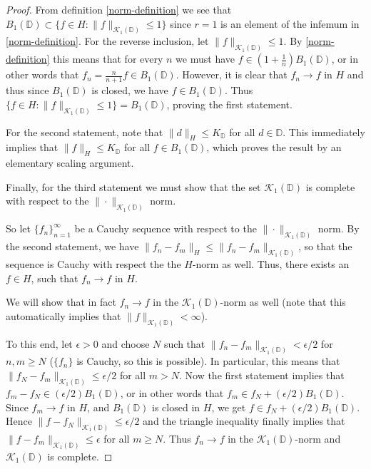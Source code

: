 \begin{proof}
 From definition \eqref{norm-definition} we see that $B_1(\mathbb{D}) \subset \{f\in H:\|f\|_{\mathcal{K}_1(\mathbb{D})}\leq 1\}$ since $r=1$ is an element of the infemum in \eqref{norm-definition}. For the reverse inclusion, let $\|f\|_{\mathcal{K}_1(\mathbb{D})}\leq 1$. By \eqref{norm-definition} this means that for every $n$ we must have $f\in (1 + \frac{1}{n})B_1(\mathbb{D})$, or in other words that $f_n = \frac{n}{n+1}f\in B_1(\mathbb{D})$. However, it is clear that $f_n\rightarrow f$ in $H$ and thus since $B_1(\mathbb{D})$ is closed, we have $f\in B_1(\mathbb{D})$. Thus $\{f\in H:\|f\|_{\mathcal{K}_1(\mathbb{D})}\leq 1\} = B_1(\mathbb{D})$, proving the first statement.
 
 For the second statement, note that $\|d\|_H\leq K_\mathbb{D}$ for all $d\in \mathbb{D}$. This immediately implies that $\|f\|_H\leq K_\mathbb{D}$ for all $f\in B_1(\mathbb{D})$, which proves the result by an elementary scaling argument.
 
 Finally, for the third statement we must show that the set $\mathcal{K}_1(\mathbb{D})$ is complete with respect to the $\|\cdot\|_{\mathcal{K}_1(\mathbb{D})}$ norm.
 
 So let $\{f_n\}_{n=1}^\infty$ be a Cauchy sequence with respect to the $\|\cdot\|_{\mathcal{K}_1(\mathbb{D})}$ norm. By the second statement, we have $\|f_n - f_m\|_H\leq \|f_n - f_m\|_{\mathcal{K}_1(\mathbb{D})}$, so that the sequence is Cauchy with respect the the $H$-norm as well. Thus, there exists an $f\in H$, such that $f_n\rightarrow f$ in $H$.
 
 We will show that in fact $f_n\rightarrow f$ in the $\mathcal{K}_1(\mathbb{D})$-norm as well (note that this automatically implies that $\|f\|_{\mathcal{K}_1(\mathbb{D})}<\infty$). 
 
 To this end, let $\epsilon > 0$ and choose $N$ such that $\|f_n - f_m\|_{\mathcal{K}_1(\mathbb{D})} < \epsilon / 2$ for $n,m \geq N$ ($\{f_n\}$ is Cauchy, so this is possible). In particular, this means that $\|f_N - f_m\|_{\mathcal{K}_1(\mathbb{D})}\leq \epsilon / 2$ for all $m > N$. Now the first statement implies that $f_m - f_N \in (\epsilon / 2)B_1(\mathbb{D})$, or in other words that $f_m \in f_N + (\epsilon / 2)B_1(\mathbb{D})$. Since $f_m\rightarrow f$ in $H$, and $B_1(\mathbb{D})$ is closed in $H$, we get $f\in f_N + (\epsilon / 2)B_1(\mathbb{D})$. Hence $\|f - f_N\|_{\mathcal{K}_1(\mathbb{D})} \leq \epsilon / 2$ and the triangle inequality finally implies that $\|f - f_m\|_{\mathcal{K}_1(\mathbb{D})} \leq \epsilon$ for all $m \geq N$. Thus $f_n\rightarrow f$ in the $\mathcal{K}_1(\mathbb{D})$-norm and $\mathcal{K}_1(\mathbb{D})$ is complete.
\end{proof}

